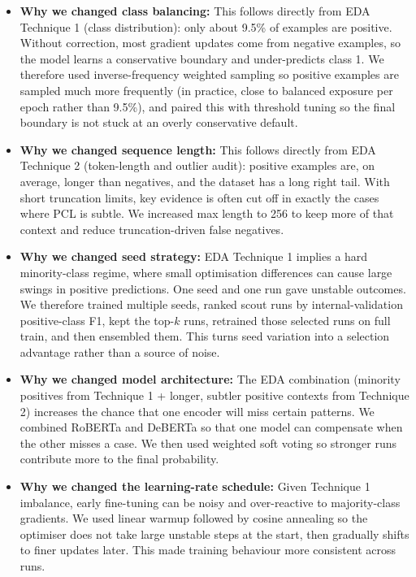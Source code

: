 \documentclass[11pt, a4paper]{article}
\begin{document}
\begin{itemize}
  \item \textbf{Why we changed class balancing:} This follows directly from EDA Technique 1 (class distribution): only about 9.5\% of examples are positive. Without correction, most gradient updates come from negative examples, so the model learns a conservative boundary and under-predicts class 1. We therefore used inverse-frequency weighted sampling so positive examples are sampled much more frequently (in practice, close to balanced exposure per epoch rather than 9.5\%), and paired this with threshold tuning so the final boundary is not stuck at an overly conservative default.

  \item \textbf{Why we changed sequence length:} This follows directly from EDA Technique 2 (token-length and outlier audit): positive examples are, on average, longer than negatives, and the dataset has a long right tail. With short truncation limits, key evidence is often cut off in exactly the cases where PCL is subtle. We increased max length to 256 to keep more of that context and reduce truncation-driven false negatives.

  \item \textbf{Why we changed seed strategy:} EDA Technique 1 implies a hard minority-class regime, where small optimisation differences can cause large swings in positive predictions. One seed and one run gave unstable outcomes. We therefore trained multiple seeds, ranked scout runs by internal-validation positive-class F1, kept the top-\(k\) runs, retrained those selected runs on full train, and then ensembled them. This turns seed variation into a selection advantage rather than a source of noise.

  \item \textbf{Why we changed model architecture:} The EDA combination (minority positives from Technique 1 + longer, subtler positive contexts from Technique 2) increases the chance that one encoder will miss certain patterns. We combined RoBERTa and DeBERTa so that one model can compensate when the other misses a case. We then used weighted soft voting so stronger runs contribute more to the final probability.

  \item \textbf{Why we changed the learning-rate schedule:} Given Technique 1 imbalance, early fine-tuning can be noisy and over-reactive to majority-class gradients. We used linear warmup followed by cosine annealing so the optimiser does not take large unstable steps at the start, then gradually shifts to finer updates later. This made training behaviour more consistent across runs.


\end{itemize}
\end{document}
